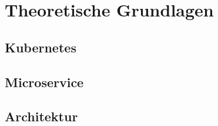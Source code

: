 \chapter{Theoretische Grundlagen}
\section{Kubernetes}
\section{Microservice}
\section{Architektur}
